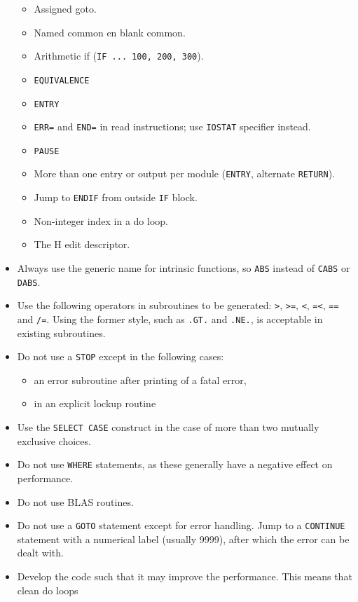 \documentclass[12pt]{book}
\begin{document}
\begin{itemize}
\begin{itemize}
          \item Assigned goto.
          \item Named common en blank common.
          \item Arithmetic if ({\tt IF ... 100, 200, 300}).
          \item {\tt EQUIVALENCE}
          \item {\tt ENTRY}
          \item {\tt ERR=} and {\tt END=} in read instructions; use {\tt IOSTAT} specifier instead.
          \item {\tt PAUSE}
          \item More than one entry or output per module ({\tt ENTRY}, alternate {\tt RETURN}).
          \item Jump to {\tt ENDIF} from outside {\tt IF} block.
          \item Non-integer index in a do loop.
          \item The H edit descriptor.
        \end{itemize}
  \item Always use the generic name for intrinsic functions, so {\tt ABS} instead of {\tt CABS} or {\tt DABS}.
  \item Use the following operators in subroutines to be generated: {\tt >}, {\tt >=}, {\tt <}, {\tt =<}, {\tt ==} and
        {\tt /=}. Using the former style, such as {\tt .GT.} and {\tt .NE.}, is acceptable in existing subroutines.
  \item Do not use a {\tt STOP} except in the following cases:
        \begin{itemize}
          \item an error subroutine after printing of a fatal error,
          \item in an explicit lockup routine
        \end{itemize}
  \item Use the {\tt SELECT CASE} construct in the case of more than two mutually exclusive choices.
  \item Do not use {\tt WHERE} statements, as these generally have a negative effect on performance.
  \item Do not use BLAS routines.
  \item Do not use a {\tt GOTO} statement except for error handling. Jump to a {\tt CONTINUE} statement with a
        numerical label (usually 9999), after which the error can be dealt with.
  \item Develop the code such that it may improve the performance. This means that clean do loops

\end{itemize}
\end{document}
